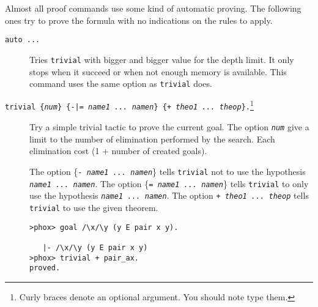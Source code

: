 Almost all proof commands use some kind of automatic proving. The
following ones try to prove the formula with no indications on the
rules to apply.
\begin{description}

\item[{\tt auto ...}]
  
  Tries {\tt trivial} with bigger and bigger value for the depth limit. It only
  stops when it succeed or when not enough memory is available. This command
  uses the same option as {\tt trivial} does.

\item[{\tt trivial \{{\em num}\} \{{-|= \em name1 ... namen}\} \{{+ \em theo1
      ... theop}\}.}\footnote{Curly braces denote an optional argument. You
    should note type them.}]

  Try a simple trivial tactic to prove the current goal. The option
  {\tt\em num} give a limit to the number of elimination performed by
  the search. Each elimination cost (1 + number of created goals).

  The option \{{\tt- \em name1 ... namen}\} tells {\tt trivial} not to use the
  hypothesis {\tt\em name1 ... namen}. The option \{{\tt= \em name1 ...
    namen}\} tells {\tt trivial} to only use the hypothesis {\tt\em name1 ...
    namen}.  The option {\tt + \em theo1 ... theop} tells {\tt trivial} to use
  the given theorem.

\begin{verbatim}
>phox> goal /\x/\y (y E pair x y).
   
   |- /\x/\y (y E pair x y)
>phox> trivial + pair_ax.
proved.
\end{verbatim}
\end{description}


